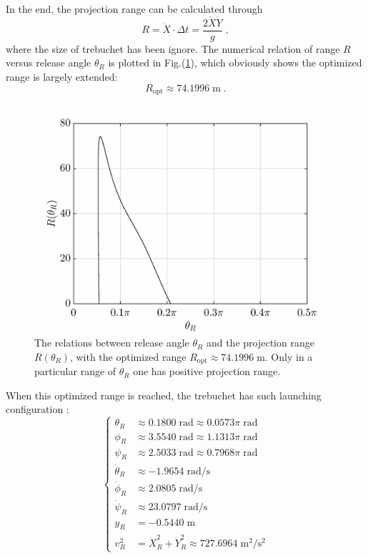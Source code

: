 \documentclass[%
reprint,
amsmath,amssymb,
aps,
]{revtex4-1}
\begin{document}
	
	In the end, the projection range can be calculated through
	\begin{equation}
	R = \dot{X}\cdot \Delta t =  \frac{2 \dot{X}\dot{Y}}{g}\;,
	\end{equation}
	where the size of trebuchet has been ignore.
	The numerical relation of range $R$ versus release angle $\theta_R$ is plotted in Fig.(\ref{ultrange}), which obviously shows the optimized range is largely extended:
	\begin{equation}
	R_{\mathrm{opt}}\approx 74.1996\;\mathrm{m}\;.
	\end{equation}
	\begin{figure}[h]
		\centering
		\includegraphics[scale=0.33]{ultRange.eps}
		\caption{The relations between release angle $\theta_R$ and the projection range $R(\theta_R)$, with the optimized range $R_{\mathrm{opt}}\approx 74.1996\;\mathrm{m}$. Only in a particular range of $\theta_R$ one has positive projection range.}
		\label{ultrange}
	\end{figure}
	When this optimized range is reached, the trebuchet has such launching configuration :
	\begin{equation}
	\left\{
	\begin{aligned}
	\theta_R &\approx 0.1800\;\mathrm{rad} \approx 0.0573\pi\;\mathrm{rad}\\
	\phi_R &\approx 3.5540\;\mathrm{rad} \approx 1.1313\pi\;\mathrm{rad}\\
	\psi_R &\approx 2.5033\;\mathrm{rad} \approx 0.7968\pi\;\mathrm{rad}\\
	\dot{\theta}_R &\approx -1.9654\;\mathrm{rad/s}\\
	\dot{\phi}_R &\approx 2.0805\;\mathrm{rad/s}\\
	\dot{\psi}_R &\approx 23.0797\;\mathrm{rad/s}\\
	y_R &=-0.5440\;\mathrm{m}\\
	v_R^2 &= \dot{X}_R^2 + \dot{Y}_R^2 \approx 727.6964\;\mathrm{m^2/s^2}
	\end{aligned}
	\right.
	\end{equation}
\end{document}

